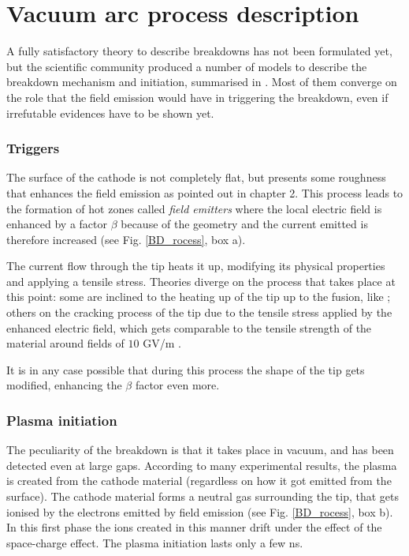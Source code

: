 \section[Vacuum arc process description]{Vacuum arc process description}

A fully satisfactory theory to describe breakdowns has not been formulated yet, but the scientific community produced a number of models to describe the breakdown mechanism and initiation, summarised in \cite{soviet:1983,davies:triggers}. Most of them converge on the role that the field emission would have in triggering the breakdown, even if irrefutable  evidences have to be shown yet.

\subsubsection[Triggers]{Triggers}

The surface of the cathode is not completely flat, but presents some roughness that enhances the field emission as pointed out in chapter 2. This process leads to the formation of hot zones called \textit{field emitters} where the local electric field is enhanced by a factor $\beta$ because of the geometry and the current emitted is therefore increased (see Fig. \ref{BD_rocess}, box a). 

The current flow through the tip heats it up, modifying its physical properties and applying a tensile stress. Theories diverge on the process that takes place at this point: some are inclined to the heating up of the tip up to the fusion, like \cite{Grudiev:newLoc}; others on the cracking process of the tip due to the tensile stress applied by the enhanced electric field, which gets comparable to the tensile strength of the material around fields of $10$ GV/m  \cite{Insepov:1373092}.

It is in any case possible that during this process the shape of the tip gets modified, enhancing the $\beta$ factor even more.


\subsubsection[Plasma initiation]{Plasma initiation}

The peculiarity of the breakdown is that it takes place in vacuum, and has been detected even at large gaps. According to many experimental results, the plasma is created from the cathode material (regardless on how it got emitted from the surface). The cathode material forms a neutral gas surrounding the tip, that gets ionised by the electrons emitted by field emission (see Fig. \ref{BD_rocess}, box b). In this first phase the ions created in this manner drift under the effect of the space-charge effect. The plasma initiation lasts only a few ns.

